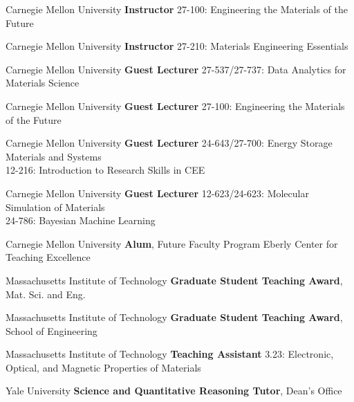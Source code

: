\vspace{-1mm}
    {Carnegie Mellon University}
    {\textbf{Instructor}}
    {27-100: Engineering the Materials of the Future}

    {Carnegie Mellon University}
    {\textbf{Instructor}}
    {27-210: Materials Engineering Essentials}

\vspace{-2mm}
\datedsubsection{}
    {Carnegie Mellon University}
    {\textbf{Guest Lecturer}}
    {27-537/27-737: Data Analytics for Materials Science}

\vspace{-2mm}
    {Carnegie Mellon University}
    {\textbf{Guest Lecturer}}
    {27-100: Engineering the Materials of the Future}

\vspace{-2mm}
    {Carnegie Mellon University}
    {\textbf{Guest Lecturer}}
    {24-643/27-700: Energy Storage Materials and Systems\\
    12-216: Introduction to Research Skills in CEE}

\vspace{-2mm}
    {Carnegie Mellon University}
    {\textbf{Guest Lecturer}}
    {12-623/24-623: Molecular Simulation of Materials\\
    24-786: Bayesian Machine Learning}

\vspace{2.2mm}
    {Carnegie Mellon University}
    {\textbf{Alum}, Future Faculty Program}
    {Eberly Center for Teaching Excellence}

\vspace{2.2mm}
    {Massachusetts Institute of Technology}
    {\textbf{Graduate Student Teaching Award}, Mat. Sci. and Eng.}{}

\datedsubsectionnarrow{}
    {Massachusetts Institute of Technology}
    {\textbf{Graduate Student Teaching Award}, School of Engineering}{}

\vspace{-2mm}
    {Massachusetts Institute of Technology}
    {\textbf{Teaching Assistant}}
    {3.23: Electronic, Optical, and Magnetic Properties of Materials}

\vspace{2.2mm}
    {Yale University}
    {\textbf{Science and Quantitative Reasoning Tutor}, Dean's Office}{}
